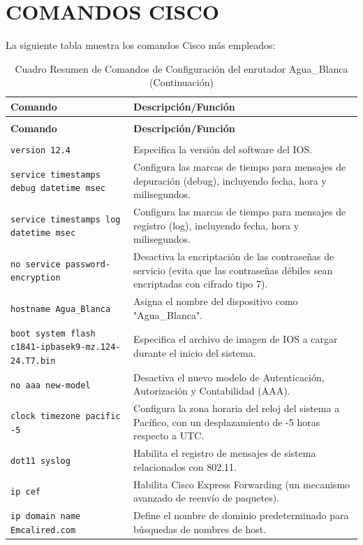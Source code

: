\documentclass[a5paper]{book}%
\begin{document}
\chapter{COMANDOS CISCO}

La siguiente tabla muestra los comandos Cisco más empleados:


\begin{longtable}{|p{6cm}|p{4cm}|}
	
\hline
\textbf{Comando} & \textbf{Descripción/Función} \\
\hline
\endfirsthead
\caption{Cuadro Resumen de Comandos de Configuración del enrutador Agua\_Blanca (Continuación)}\\
\hline
\textbf{Comando} & \textbf{Descripción/Función} \\
\hline
\endhead
\hline
\endfoot
\multicolumn{2}{|c|}{\textbf{Configuración General/Sistema}}  \\\hline
\texttt{version 12.4} & Especifica la versión del software del IOS. \\
\texttt{service timestamps debug datetime msec} & Configura las marcas de tiempo para mensajes de depuración (debug), incluyendo fecha, hora y milisegundos. \\
\texttt{service timestamps log datetime msec} & Configura las marcas de tiempo para mensajes de registro (log), incluyendo fecha, hora y milisegundos. \\
\texttt{no service password-encryption} & Desactiva la encriptación de las contraseñas de servicio (evita que las contraseñas débiles sean encriptadas con cifrado tipo 7). \\
\texttt{hostname Agua\_Blanca} & Asigna el nombre del dispositivo como "Agua\_Blanca". \\
\texttt{boot system flash c1841-ipbasek9-mz.124-24.T7.bin} & Especifica el archivo de imagen de IOS a cargar durante el inicio del sistema. \\
\texttt{no aaa new-model} & Desactiva el nuevo modelo de Autenticación, Autorización y Contabilidad (AAA). \\
\texttt{clock timezone pacific -5} & Configura la zona horaria del reloj del sistema a Pacífico, con un desplazamiento de -5 horas respecto a UTC. \\
\texttt{dot11 syslog} & Habilita el registro de mensajes de sistema relacionados con 802.11. \\
\texttt{ip cef} & Habilita Cisco Express Forwarding (un mecanismo avanzado de reenvío de paquetes). \\
\texttt{ip domain name Emcalired.com} & Define el nombre de dominio predeterminado para búsquedas de nombres de host. \\

\end{longtable}
\end{document}
